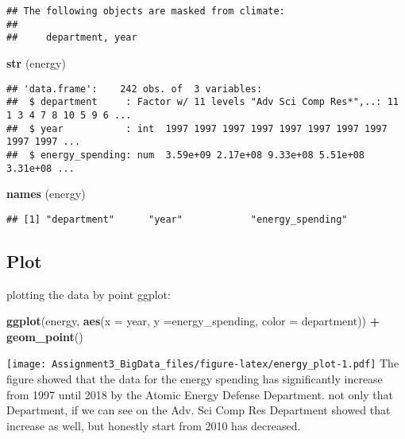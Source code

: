 \documentclass[]{article}
\newenvironment{Shaded}{\begin{snugshade}}{\end{snugshade}}
\newcommand{\KeywordTok}[1]{\textcolor[rgb]{0.13,0.29,0.53}{\textbf{#1}}}
\newcommand{\DataTypeTok}[1]{\textcolor[rgb]{0.13,0.29,0.53}{#1}}
\newcommand{\StringTok}[1]{\textcolor[rgb]{0.31,0.60,0.02}{#1}}
\newcommand{\OperatorTok}[1]{\textcolor[rgb]{0.81,0.36,0.00}{\textbf{#1}}}
\newcommand{\NormalTok}[1]{#1}
\begin{document}
\begin{verbatim}
## The following objects are masked from climate:
## 
##     department, year
\end{verbatim}

\begin{Shaded}
\begin{Highlighting}[]
\KeywordTok{str}\NormalTok{ (energy)}
\end{Highlighting}
\end{Shaded}

\begin{verbatim}
## 'data.frame':    242 obs. of  3 variables:
##  $ department     : Factor w/ 11 levels "Adv Sci Comp Res*",..: 11 1 3 4 7 8 10 5 9 6 ...
##  $ year           : int  1997 1997 1997 1997 1997 1997 1997 1997 1997 1997 ...
##  $ energy_spending: num  3.59e+09 2.17e+08 9.33e+08 5.51e+08 3.31e+08 ...
\end{verbatim}

\begin{Shaded}
\begin{Highlighting}[]
\KeywordTok{names}\NormalTok{ (energy)}
\end{Highlighting}
\end{Shaded}

\begin{verbatim}
## [1] "department"      "year"            "energy_spending"
\end{verbatim}

\subsection{Plot}\label{plot}

plotting the data by point ggplot:

\begin{Shaded}
\begin{Highlighting}[]
\KeywordTok{ggplot}\NormalTok{(energy, }\KeywordTok{aes}\NormalTok{(}\DataTypeTok{x =}\NormalTok{ year, }\DataTypeTok{y =}\NormalTok{energy_spending, }\DataTypeTok{color =}\NormalTok{ department)) }\OperatorTok{+}
\StringTok{   }\KeywordTok{geom_point}\NormalTok{()}
\end{Highlighting}
\end{Shaded}

\texttt{[image: Assignment3\_BigData\_files/figure-latex/energy\_plot-1.pdf]}
The figure showed that the data for the energy spending has
significantly increase from 1997 until 2018 by the Atomic Energy Defense
Department. not only that Department, if we can see on the Adv. Sci Comp
Res Department showed that increase as well, but honestly start from
2010 has decreased.
\end{document}
